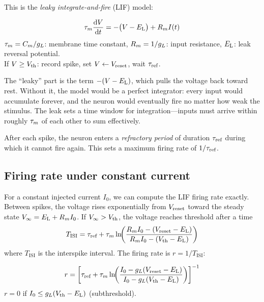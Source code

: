 This is the \emph{leaky integrate-and-fire} (LIF) model:

\begin{keyequation}
\begin{equation}
  \tau_m \frac{\mathop{}\!\mathrm{d} V}{\mathop{}\!\mathrm{d} t} = -\bigl(V - E_{\mathrm{L}}\bigr) + R_m I(t)
  \label{eq:lif}
\end{equation}
\tcblower
$\tau_m = C_m/g_L$: membrane time constant, \quad
$R_m = 1/g_L$: input resistance, \quad
$E_{\mathrm{L}}$: leak reversal potential. \\[4pt]
If $V \geq V_{\text{th}}$: record spike, set $V \leftarrow V_{\text{reset}}$, wait $\tau_{\text{ref}}$.
\end{keyequation}

\noindent The ``leaky'' part is the term $-(V - E_{\mathrm{L}})$, which pulls the voltage back toward rest. Without it, the model would be a perfect integrator: every input would accumulate forever, and the neuron would eventually fire no matter how weak the stimulus. The leak sets a time window for integration---inputs must arrive within roughly $\tau_m$ of each other to sum effectively.

After each spike, the neuron enters a \emph{refractory period} of duration $\tau_{\text{ref}}$ during which it cannot fire again. This sets a maximum firing rate of $1/\tau_{\text{ref}}$.

\subsection{Firing rate under constant current}

For a constant injected current $I_0$, we can compute the LIF firing rate exactly. Between spikes, the voltage rises exponentially from $V_{\text{reset}}$ toward the steady state $V_\infty = E_{\mathrm{L}} + R_m I_0$. If $V_\infty > V_{\text{th}}$, the voltage reaches threshold after a time
%
\[
  T_{\text{ISI}} = \tau_{\text{ref}} + \tau_m \ln\!\biggl(\frac{R_m I_0 - (V_{\text{reset}} - E_{\mathrm{L}})}{R_m I_0 - (V_{\text{th}} - E_{\mathrm{L}})}\biggr)
\]
%
where $T_{\text{ISI}}$ is the interspike interval. The firing rate is $r = 1/T_{\text{ISI}}$:

\begin{keyequation}
\begin{equation}
  r = \biggl[\tau_{\text{ref}} + \tau_m \ln\!\biggl(\frac{I_0 - g_L(V_{\text{reset}} - E_{\mathrm{L}})}{I_0 - g_L(V_{\text{th}} - E_{\mathrm{L}})}\biggr)\biggr]^{-1}
  \label{eq:lif-rate}
\end{equation}
\tcblower
$r = 0$ if $I_0 \leq g_L(V_{\text{th}} - E_{\mathrm{L}})$ (subthreshold).
\end{keyequation}

